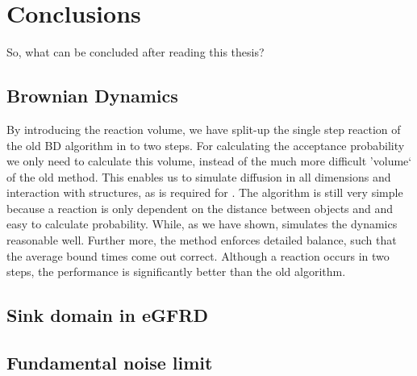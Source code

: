 \section{Conclusions}

So, what can be concluded after reading this thesis?

\subsection{Brownian Dynamics}
By introducing the reaction volume, we have split-up the single step reaction of the old BD algorithm in to two steps. For calculating the acceptance probability we only need to calculate this volume, instead of the much more difficult 'volume` of the old method. This enables us to simulate diffusion in all dimensions and interaction with structures, as is required for \GFRD. The algorithm is still very simple because a reaction is only dependent on the distance between objects and and easy to calculate probability. While, as we have shown, simulates the dynamics reasonable well. Further more, the method enforces detailed balance, such that the average bound times come out correct. Although a reaction occurs in two steps, the performance is significantly better than the old algorithm.



\subsection{Sink domain in eGFRD}




\subsection{Fundamental noise limit}